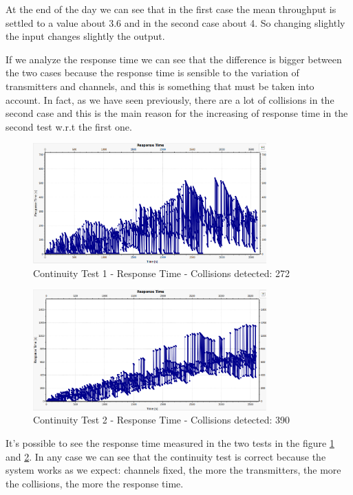 \noindent At the end of the day we can see that in the first case the mean throughput is settled to a value about 3.6 and in the second case about 4. So changing slightly the input changes slightly the output.

\noindent If we analyze the response time we can see that the difference is bigger between the two cases because the response time is sensible to the variation of transmitters and channels, and this is something that must be taken into account. In fact, as we have seen previously, there are a lot of collisions in the second case and this is the main reason for the increasing of response time in the second test w.r.t the first one.



\begin{figure}[H]
	\centering
	\includegraphics[width=0.8\textwidth]{img/continuityTest1a_responsetime.png}
	\caption{Continuity Test 1 - Response Time - Collisions detected: 272}
	\label {img: continuityTest1a_responsetime}
\end{figure}

\begin{figure}[H]
	\centering
	\includegraphics[width=0.8\textwidth]{img/continuityTest1b_responsetime.png}
	\caption{Continuity Test 2 - Response Time - Collisions detected: 390}
	\label {img: continuityTest1b_responsetime}
\end{figure}

\noindent It's possible to see the response time measured in the two tests in the figure \ref{img: continuityTest1a_responsetime} and \ref{img: continuityTest1b_responsetime}. In any case we can see that the continuity test is correct because the system works as we expect: channels fixed, the more the transmitters, the more the collisions, the more the response time.

